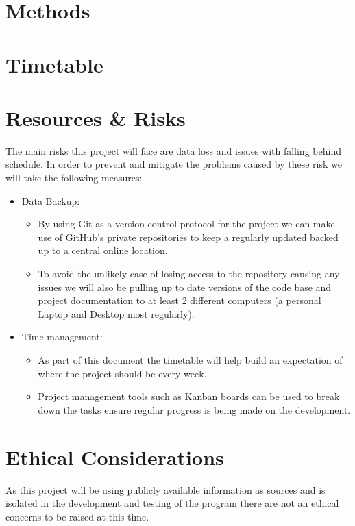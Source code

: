 \documentclass[twoside]{article}
\begin{document}
\section{Methods}


\section{Timetable}


\section{Resources \& Risks}

The main risks this project will face are data loss and issues with falling behind schedule. In order to prevent and mitigate the problems caused by these risk we will take the following measures:
\begin{itemize}
    \item Data Backup:
    \begin{itemize}
        \item By using Git as a version control protocol for the project we can make use of GitHub's private repositories to keep a regularly updated backed up to a central online location.
        \item To avoid the unlikely case of losing access to the repository causing any issues we will also be pulling up to date versions of the code base and project documentation to at least 2 different computers (a personal Laptop and Desktop most regularly).
    \end{itemize}
    \item Time management:
    \begin{itemize}
        \item As part of this document the timetable will help build an expectation of where the project should be every week.
        \item Project management tools such as Kanban boards can be used to break down the tasks ensure regular progress is being made on the development.
    \end{itemize}
\end{itemize}


\section{Ethical Considerations}

As this project will be using publicly available information as sources and is isolated in the development and testing of the program there are not an ethical concerns to be raised at this time.
\end{document}

